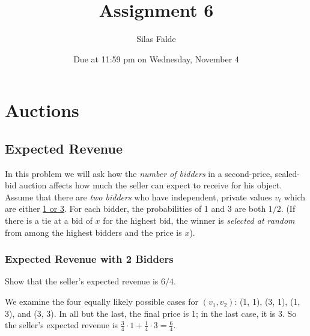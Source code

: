 \documentclass[newpages, arabicsubsec]{assignment}
\title{Assignment 6}
\author{Silas Falde}
\date{Due at 11:59 pm on Wednesday, November 4}
\begin{document}
\maketitle
\tableofcontents

\section{Auctions}

\subsection{Expected Revenue}

\begin{problem}
In this problem we will ask how the \textit{number of bidders} in a second-price, sealed-bid auction affects how much the seller can expect to receive for his object. Assume that there are \textit{two bidders} who have independent, private values \(v_i\) which are either \underline{1 or 3}. For each bidder, the probabilities of 1 and 3 are both \(1/2\). (If there is a tie at a bid of \(x\) for the highest bid, the winner is \textit{selected at random} from among the highest bidders and the price is \(x\)).
\end{problem}

\subsubsection{Expected Revenue with 2 Bidders}
\begin{problem}
Show that the seller's expected revenue is \(6/4\).
\end{problem}
\begin{solution}
    We examine the four equally likely possible cases for $(v_1, v_2)$: (1, 1), (3, 1), (1, 3), and (3, 3). In all but the last, the final price is 1; in the last case, it is 3. So the seller's expected revenue is $\frac{3}{4} \cdot 1 + \frac{1}{4} \cdot 3 = \frac{6}{4}$.
\end{solution}
\end{document}
